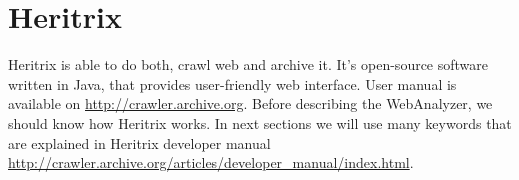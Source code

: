 \documentclass[11pt,a4paper]{article}
\begin{document}
\section{Heritrix}

Heritrix is able to do both, crawl web and archive it. It's open-source software written in Java, that provides user-friendly web interface. User manual is available on \url{http://crawler.archive.org}. Before describing the WebAnalyzer, we should know how Heritrix works. In next sections we will use many keywords that are explained in Heritrix developer manual \url{http://crawler.archive.org/articles/developer_manual/index.html}.

\end{document}
